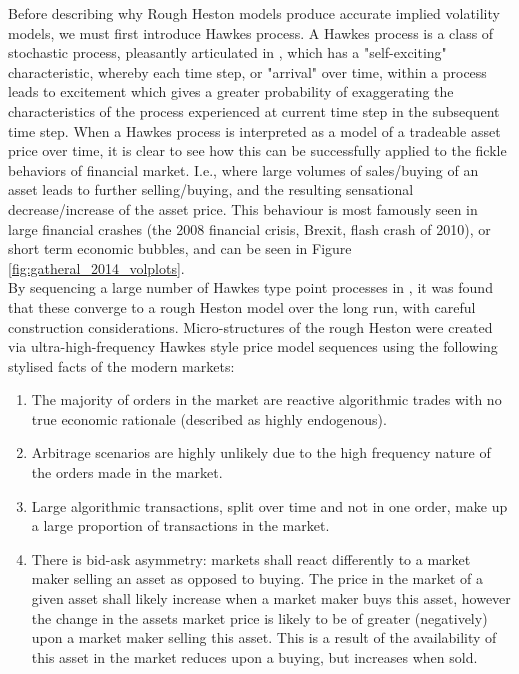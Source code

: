 \documentclass[12pt,oneside]{article}
\begin{document}
Before describing why Rough Heston models produce accurate implied volatility models, we must first introduce Hawkes process. A Hawkes process is a class of stochastic process, pleasantly articulated in \cite{laub2015hawkes}, which has a "self-exciting" characteristic, whereby each time step, or "arrival" over time, within a process leads to excitement which gives a greater probability of exaggerating the characteristics of the process experienced at current time step in the subsequent time step. When a Hawkes process is interpreted as a model of a tradeable asset price over time, it is clear to see how this can be successfully applied to the fickle behaviors of financial market. I.e., where large volumes of sales/buying of an asset leads to further selling/buying, and the resulting sensational decrease/increase of the asset price. This behaviour is most famously seen in large financial crashes (the 2008 financial crisis, Brexit, flash crash of 2010), or short term economic bubbles, and can be seen in Figure \ref{fig:gatheral_2014_volplots}. 
\\

By sequencing a large number of Hawkes type point processes in \cite{omar2016microstructural}, it was found that these converge to a rough Heston model over the long run, with careful construction considerations. Micro-structures of the rough Heston were created via ultra-high-frequency Hawkes style price model sequences using the following stylised facts of the modern markets: 
\begin{enumerate} 
\item The majority of orders in the market are reactive algorithmic trades with no true economic rationale (described as highly endogenous). 
\item Arbitrage scenarios are highly unlikely due to the high frequency nature of the orders made in the market.  
\item Large algorithmic transactions, split over time and not in one order, make up a large proportion of transactions in the market.
\item There is bid-ask asymmetry: markets shall react differently to a market maker selling an asset as opposed to buying. The price in the market of a given asset shall likely increase when a market maker buys this asset, however the change in the assets market price is likely to be of greater (negatively) upon a market maker selling this asset. This is a result of the availability of this asset in the market reduces upon a buying, but increases when sold.  
\end{enumerate}
\\
\end{document}
